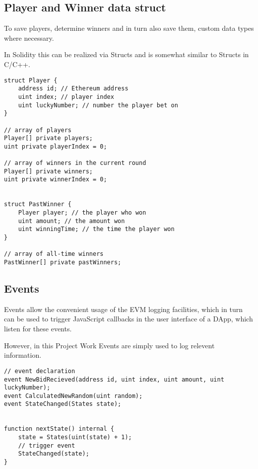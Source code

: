 \subsection{Player and Winner data struct}\label{sec:structs}

To save players, determine winners and in turn also save them, custom data types where necessary.

In Solidity this can be realized via Structs and is somewhat similar to Structs in C/C++.

\begin{lstlisting}[language=Solidity]
struct Player {
    address id; // Ethereum address
    uint index; // player index
    uint luckyNumber; // number the player bet on
}

// array of players
Player[] private players;
uint private playerIndex = 0;

// array of winners in the current round
Player[] private winners;
uint private winnerIndex = 0;


struct PastWinner {
    Player player; // the player who won
    uint amount; // the amount won
    uint winningTime; // the time the player won
}

// array of all-time winners
PastWinner[] private pastWinners;
\end{lstlisting}


\subsection{Events}\label{sec:events}

Events allow the convenient usage of the \ac{EVM} logging facilities, which in turn can be used to trigger JavaScript callbacks in the user interface of a \ac{DApp}, which listen for these events.

However, in this Project Work Events are simply used to log relevent information.


\begin{lstlisting}[language=Solidity]
// event declaration
event NewBidRecieved(address id, uint index, uint amount, uint luckyNumber);
event CalculatedNewRandom(uint random);
event StateChanged(States state);


function nextState() internal {
    state = States(uint(state) + 1);
    // trigger event
    StateChanged(state);
}
\end{lstlisting}

